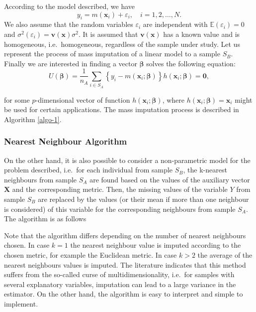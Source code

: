 \documentclass[
]{jss}
\begin{document}
According to the model described, we have \[
y_i=m\left(\boldsymbol{x}_i\right)+\varepsilon_i, \quad i=1,2, \ldots, N.
\] We also assume that the random variables \(\varepsilon_i\) are
independent with \(\mathbb{E} \left(\varepsilon_i \right) = 0\) and
\(\sigma^2 \left(\varepsilon_i \right) = \mathbf{v} \left(\boldsymbol{x}\right) \sigma^2\).
It is assumed that \(\mathbf{v} \left(\boldsymbol{x}\right)\) has a
known value and is homogeneous, i.e.~homogeneous, regardless of the
sample under study. Let us represent the process of mass imputation of a
linear model to a sample \(S_B\). Finally we are interested in finding a
vector \(\boldsymbol{\beta}\) solves the following equation:
\begin{equation}
\label{eq-2.3}
U(\boldsymbol{\beta})=\frac{1}{n_A} \sum_{i \in S_A}\left\{y_i-m\left(\boldsymbol{x}_i ; \boldsymbol{\beta}\right)\right\} h\left(\boldsymbol{x}_i ; \boldsymbol{\beta}\right)=\mathbf{0},
\end{equation}

for some \(p\)-dimensional vector of function
\(h\left(\boldsymbol{x}_i ; \boldsymbol{\beta}\right)\), where
\(h\left(\boldsymbol{x}_i ; \boldsymbol{\beta}\right) = \boldsymbol{x}_i\)
might be used for certain applications. The mass imputation process is
described in Algorithm \ref{algo-1}.

\subsubsection{Nearest Neighbour
Algorithm}\label{nearest-neighbour-algorithm}

On the other hand, it is also possible to consider a non-parametric
model for the problem described, i.e.~for each individual from sample
\(S_B\), the k-nearest neighbours from sample \(S_A\) are found based on
the values of the auxiliary vector \(\boldsymbol{X}\) and the
corresponding metric. Then, the missing values of the variable \(Y\)
from sample \(S_B\) are replaced by the values (or their mean if more
than one neighbour is considered) of this variable for the corresponding
neighbours from sample \(S_A\). The algorithm is as follows

Note that the algorithm differs depending on the number of nearest
neighbours chosen. In case \(k=1\) the nearest neighbour value is
imputed according to the chosen metric, for example the Euclidean
metric. In case \(k>2\) the average of the nearest neighbours values is
imputed. The literature indicates that this method suffers from the
so-called curse of multidimensionality, i.e.~for samples with several
explanatory variables, imputation can lead to a large variance in the
estimator. On the other hand, the algorithm is easy to interpret and
simple to implement.
\end{document}
